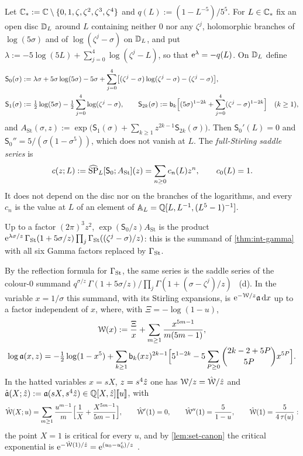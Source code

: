 \begin{defn}
\label{def:gam-c}
Let $\mathbb{C}_{\ast}:=\mathbb{C}\setminus\{0,1,\zeta,\zeta^2,\zeta^3,\zeta^4\}$ and $q(L):=(1-L^{-5})/5^5$. For $L\in\mathbb{C}_{\ast}$ fix an open disc $\mathbb{D}_L$ around $L$ containing neither $0$ nor any $\zeta^j$, holomorphic branches of $\log(5\sigma)$ and of $\log(\zeta^j-\sigma)$ on $\mathbb{D}_L$, and put $\lambda:=-5\log(5L)+\sum_{j=0}^4\log(\zeta^j-L)$, so that $\mathrm{e}^\lambda=-q(L)$. On $\mathbb{D}_L$ define
\begin{align*}
\mathsf S_0(\sigma)&:=\lambda\sigma+5\sigma\log(5\sigma)-5\sigma+\sum_{j=0}^4\bigl[(\zeta^j-\sigma)\log(\zeta^j-\sigma)-(\zeta^j-\sigma)\bigr],\\
\mathsf S_1(\sigma)&:=\tfrac12\log(5\sigma)-\tfrac12\sum_{j=0}^4\log(\zeta^j-\sigma),\qquad\mathsf S_{2k}(\sigma):=\mathsf{b}_k\Bigl[(5\sigma)^{1-2k}+\sum_{j=0}^4(\zeta^j-\sigma)^{1-2k}\Bigr]\quad(k\geq1),
\end{align*}
and $A_{\mathrm{St}}(\sigma,z):=\exp\bigl(\mathsf S_1(\sigma)+\sum_{k\geq1}z^{2k-1}\mathsf S_{2k}(\sigma)\bigr)$.
Then $\mathsf S_0'(L)=0$ and $\mathsf S_0''=5/(\sigma(1-\sigma^5))$, which does not vanish at $L$. The \emph{full-Stirling saddle series} is
\[
c(z;L):=\widehat{\mathrm{SP}}_L[\mathsf S_0;A_{\mathrm{St}}](z)=\sum_{n\geq0}c_n(L)z^n,\qquad c_0(L)=1 .
\]
It does not depend on the disc nor on the branches of the logarithms, and every $c_n$ is the value at $L$ of an element of $\mathbb{A}_{L}=\mathbb{Q}[L,L^{-1},(L^5-1)^{-1}]$.
\end{defn}

Up to a factor $(2\pi)^3z^2$, $\exp(\mathsf S_0/z)A_{\mathrm{St}}$ is the product $\mathrm{e}^{\lambda\sigma/z}\,\Gamma_{\mathrm{St}}(1+5\sigma/z)\prod_j\Gamma_{\mathrm{St}}((\zeta^j-\sigma)/z)$: this is the summand of \cref{thm:int-gamma} with all six Gamma factors replaced by $\Gamma_{\mathrm{St}}$. 

By the reflection formula for $\Gamma_{\mathrm{St}}$, the same series is the saddle series of the colour-$0$ summand $q^{\sigma/z}\,\Gamma(1+5\sigma/z)/\prod_j\Gamma(1+(\sigma-\zeta^j)/z)$ ~(d). In the variable $x=1/\sigma$ this summand, with its Stirling expansions, is $\mathrm{e}^{-\mathcal{W}/z}\mathfrak{a}\,\mathrm{d} x$ up to a factor independent of $x$, where, with $\Xi=-\log(1-u)$,
\begin{gather*}
\mathcal{W}(x):=\frac{\Xi}x+\sum_{m\geq1}\frac{x^{5m-1}}{m(5m-1)},\\
\log\mathfrak{a}(x,z)=-\tfrac12\log(1-x^5)+\sum_{k\geq1}\mathsf{b}_k(xz)^{2k-1}\Bigl[5^{1-2k}-5\sum_{P\geq0}\binom{2k-2+5P}{5P}x^{5P}\Bigr].
\end{gather*}
In the hatted variables $x=sX$, $z=s^4\hat{z}$ one has $\mathcal{W}/z=\hat{\mathcal{W}}/\hat{z}$ and $\hat{\mathfrak{a}}(X;\hat{z}):=\mathfrak{a}(sX,s^4\hat{z})\in\mathbb{Q}[X,\hat{z}][\![ u ]\!]$, with
\[
\hat{\mathcal{W}}(X;u)=\sum_{m\geq1}\frac{u^{m-1}}m\Bigl[\frac1X+\frac{X^{5m-1}}{5m-1}\Bigr],\qquad\hat{\mathcal{W}}'(1)=0,\qquad\hat{\mathcal{W}}''(1)=\frac5{1-u},\qquad\hat{\mathcal{W}}(1)=\frac5{4\,\tau(u)} :
\]
the point $X=1$ is critical for every $u$, and by \cref{lem:set-canon} the critical exponential is $\mathrm{e}^{-\hat{\mathcal{W}}(1)/\hat{z}}=\mathrm{e}^{(u_0-u_0^{\mathrm c})/z}$ .

